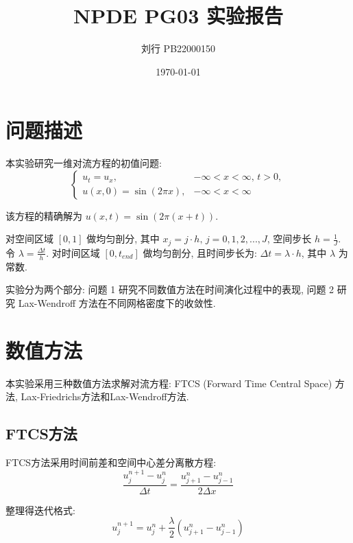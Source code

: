 \documentclass[12pt,a4paper]{article}
\title{NPDE PG03 实验报告}
\author{刘行 PB22000150}
\date{\today}
\begin{document}
    \maketitle

    \section{问题描述}
        本实验研究一维对流方程的初值问题:
        \begin{equation*}
            \begin{cases}
                u_{t} = u_{x}, & -\infty < x < \infty, \,t > 0, \\
                u(x, 0) = \sin\left(2\pi x\right), & -\infty < x < \infty
            \end{cases}
        \end{equation*}

        该方程的精确解为 $ u\left(x, t\right) = \sin\left(2\pi \left(x + t\right)\right) $.

        对空间区域 $ [0, 1] $ 做均匀剖分, 其中 $ x_{j} = j \cdot h, \, j = 0, 1, 2, ..., J $, 空间步长 $ h = \frac{1}{J} $. 令 $ \lambda = \frac{\Delta t}{h} $. 对时间区域 $ [0, t_{end}] $ 做均匀剖分, 且时间步长为: $ \Delta t = \lambda \cdot h $, 其中 $ \lambda $ 为常数.

        实验分为两个部分: 问题 1 研究不同数值方法在时间演化过程中的表现, 问题 2 研究 Lax-Wendroff 方法在不同网格密度下的收敛性.

    \section{数值方法}
        本实验采用三种数值方法求解对流方程: FTCS (Forward Time Central Space) 方法, Lax-Friedrichs方法和Lax-Wendroff方法.

        \subsection{FTCS方法}
            FTCS方法采用时间前差和空间中心差分离散方程:
            \begin{equation*}
                \frac{u_{j}^{n+1} - u_{j}^{n}}{\Delta t} = \frac{u_{j+1}^{n} - u_{j-1}^{n}}{2\Delta x}
            \end{equation*}

            整理得迭代格式:
            \begin{equation*}
                u_{j}^{n+1} = u_{j}^{n} + \frac{\lambda}{2} \left( u_{j+1}^{n} - u_{j-1}^{n} \right)
            \end{equation*}
\end{document}
